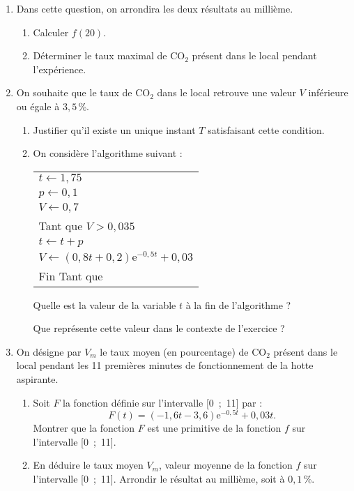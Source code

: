 \begin{enumerate}
     \item Dans cette question, on arrondira les deux résultats au millième.
     \begin{enumerate}[label=\alph*.]
          \item Calculer $f (20)$.
          \item Déterminer le taux maximal de CO$_2$ présent dans le local pendant l'expérience.
     \end{enumerate}
     \item  On souhaite que le taux de CO$_2$ dans le local retrouve une valeur $V$ inférieure ou égale à $3,5$\,\%.
     \begin{enumerate}[label=\alph*.]
          \item Justifier qu'il existe un unique instant $T$ satisfaisant cette condition.
          \item  On considère l'algorithme suivant :
          \begin{center}
               \begin{extern}%
                    \begin{tabularx}{0.6\linewidth}{|X|}\hline
                         $t \gets 1,75$\\
                         $p \gets 0,1$\\
                         $V \gets 0,7$\\
                         Tant que $V > 0,035$\\
                         \hspace{0.75cm}$t \gets t + p$\\
                         \hspace{0.75cm}$V \gets (0,8t + 0,2)\text{e}^{-0,5t} + 0,03$\\
                         Fin Tant que\\ \hline
                    \end{tabularx}
               \end{extern}
          \end{center}
          Quelle est la valeur de la variable $t$ à la fin de l'algorithme ?
          \par
          Que représente cette valeur dans le contexte de l'exercice ?
     \end{enumerate}
     \item  On désigne par $V_m$ le taux moyen (en pourcentage) de CO$_2$ présent dans le local pendant les 11 premières minutes de fonctionnement de la hotte aspirante.
     \begin{enumerate}[label=\alph*.]
          \item Soit $F$ la fonction définie sur l'intervalle [0~;~11] par :
          \[F(t) = (-1,6t -3,6)\text{e}^{-0,5t} +0,03t.\]
          Montrer que la fonction $F$ est une primitive de la fonction $f$ sur l'intervalle [0~;~11].
          \item En déduire le taux moyen $V_m$, valeur moyenne de la fonction $f$ sur l'intervalle [0~;~11].
          Arrondir le résultat au millième, soit à $0,1$\,\%.
     \end{enumerate}
\end{enumerate}
